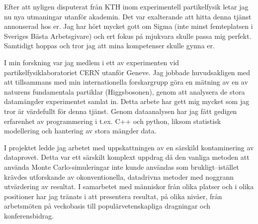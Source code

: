 \documentclass[11pt, a4paper]{../awesome-cv} %
\begin{document}
\sloppy %

\makecvheader %

\makelettertitle %


\begin{cvletter}
\vspace{.2cm}

Efter att nyligen disputerat från KTH inom experimentell partikelfysik letar jag nu nya utmaningar utanför akademin. %
Det var exalterande att hitta denna tjänst annonserad hos er.
Jag har hört mycket gott om Sigma (inte minst femteplatsen i Sveriges Bästa Arbetsgivare) och ert fokus på mjukvara skulle passa mig perfekt.
Samtidigt hoppas och tror jag att mina kompetenser skulle gynna er. 


I min forskning var jag medlem i ett av experimenten vid partikelfysiklaboratoriet CERN utanför Geneve.
Jag jobbade huvudsakligen med att tillsammans med min internationella forskargrupp göra en mätning av en av naturens fundamentala partiklar (Higgsbosonen), genom att analysera de stora datamängder experimentet samlat in. %
Detta arbete har gett mig mycket som jag tror är värdefullt för denna tjänst.
Genom dataanalysen har jag fått gedigen erfarenhet av programmering i t.ex. C++ och python, liksom statistisk modellering och hantering av stora mängder data.

I projektet ledde jag arbetet med uppskattningen av en särskild kontaminering av dataprovet. %
Detta var ett särskilt komplext uppdrag då den vanliga metoden att använda Monte Carlo-simuleringar inte kunde användas som brukligt–istället krävdes utforskande av okonventionella, datadrivna metoder med noggrann utvärdering av resultat. %
I samarbetet med människor från olika platser och i olika positioner har jag tränats i att presentera resultat, på olika nivåer, från arbetsmöten på veckobasis till populärvetenskapliga dragningar och konferensbidrag.


\end{cvletter}
\end{document}
